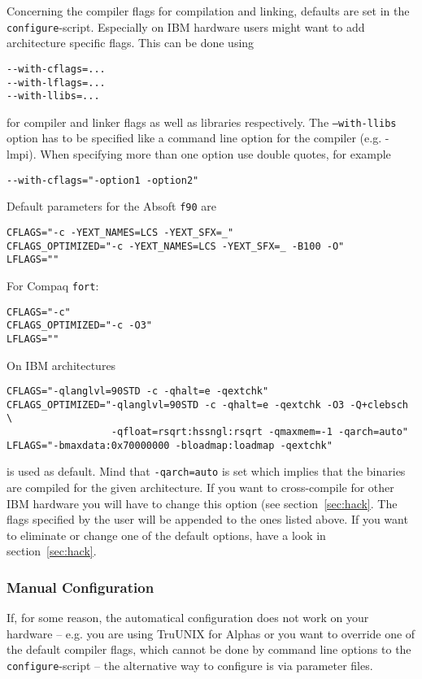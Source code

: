 \documentclass[a4paper,10pt]{article}
\begin{document}
Concerning the compiler flags for compilation and linking, defaults are set in
the \texttt{configure}-script.  Especially on IBM hardware users might want to
add architecture specific flags. This can be done using
\begin{verbatim}
--with-cflags=...
--with-lflags=...
--with-llibs=...
\end{verbatim}
for compiler and linker flags as well as libraries respectively. The \texttt{--with-llibs} option has to be specified like a command line option for the compiler (e.g. -lmpi).   When specifying more than one option use double quotes, for example
\begin{verbatim}
--with-cflags="-option1 -option2"
\end{verbatim}
Default parameters for the Absoft \texttt{f90} are
\begin{verbatim}
CFLAGS="-c -YEXT_NAMES=LCS -YEXT_SFX=_"
CFLAGS_OPTIMIZED="-c -YEXT_NAMES=LCS -YEXT_SFX=_ -B100 -O"
LFLAGS=""
\end{verbatim}
For Compaq \texttt{fort}:
\begin{verbatim}
CFLAGS="-c"
CFLAGS_OPTIMIZED="-c -O3"
LFLAGS=""
\end{verbatim}
On IBM architectures 
\begin{verbatim}
CFLAGS="-qlanglvl=90STD -c -qhalt=e -qextchk"
CFLAGS_OPTIMIZED="-qlanglvl=90STD -c -qhalt=e -qextchk -O3 -Q+clebsch \
                  -qfloat=rsqrt:hssngl:rsqrt -qmaxmem=-1 -qarch=auto"
LFLAGS="-bmaxdata:0x70000000 -bloadmap:loadmap -qextchk"
\end{verbatim}
is used as default. Mind that \texttt{-qarch=auto} is set which implies that
the binaries are compiled for the given architecture. If you want to
cross-compile for other IBM hardware you will have to change this option (see
section~\ref{sec:hack}.  The flags specified by the user will be appended to
the ones listed above.  If you want to eliminate or change one of the default
options, have a look in section~\ref{sec:hack}.

\subsubsection*{Manual Configuration}
\label{sub:parms}

If, for some reason, the automatical configuration does not work on your
hardware -- e.g. you are using TruUNIX for Alphas or you want to override one of the default compiler flags,
which cannot be done by command line options to the
\texttt{configure}-script -- the alternative way to configure is via parameter
files.  
\end{document}
